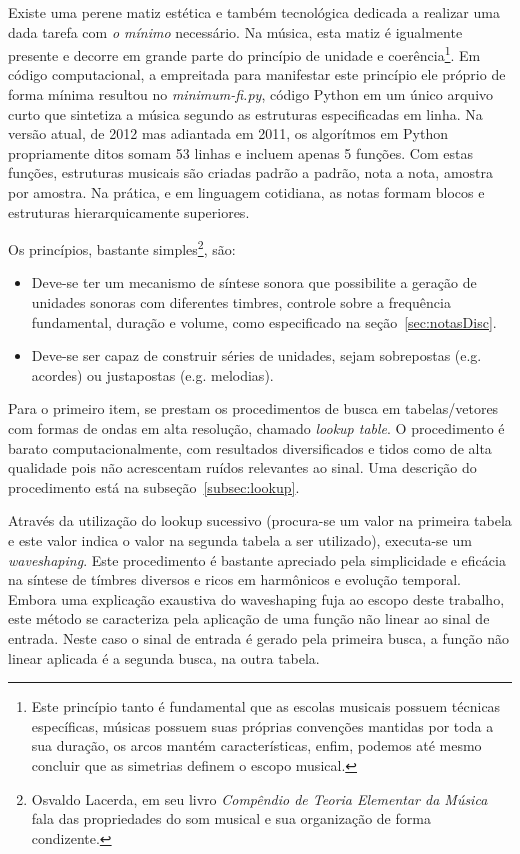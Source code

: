 Existe uma perene matiz estética e também tecnológica dedicada a realizar uma
dada tarefa com \emph{o mínimo} necessário.  Na música, esta matiz é
igualmente presente e decorre em grande parte do princípio de unidade
e coerência\footnote{Este princípio tanto é fundamental que as escolas
  musicais possuem técnicas específicas, músicas possuem suas próprias
  convenções mantidas por toda a sua duração, os arcos mantém
  características, enfim, podemos até mesmo concluir que as simetrias
  definem o escopo musical.}. 
  Em código computacional, a empreitada para
manifestar este princípio ele próprio de forma mínima resultou no
\emph{minimum-fi.py}, código Python em um único arquivo curto que
sintetiza a música segundo as estruturas especificadas em
linha. Na versão atual, de
2012 mas adiantada em 2011, os algorítmos em Python propriamente ditos
somam 53 linhas e incluem apenas 5 funções. Com estas funções,
estruturas musicais são criadas padrão a padrão, nota a nota,
amostra por amostra. Na prática, e em linguagem cotidiana,
as notas formam blocos e estruturas hierarquicamente
superiores.

Os princípios, bastante simples\footnote{Osvaldo Lacerda, em seu livro
  \emph{Compêndio de Teoria Elementar da Música} fala das propriedades
  do som musical e sua organização de forma condizente.}, são:
\begin{itemize}
  \item Deve-se ter um mecanismo de síntese sonora que possibilite a
    geração de unidades sonoras com diferentes timbres, controle sobre
    a frequência fundamental, duração e volume, como especificado na seção~\ref{sec:notasDisc}.
  \item Deve-se ser capaz de construir
    séries de unidades, sejam sobrepostas (e.g. acordes)
    ou justapostas (e.g. melodias).
\end{itemize}

Para o primeiro item, se prestam os procedimentos de busca
em tabelas/vetores com formas de ondas em alta resolução, chamado
\emph{lookup table}. O procedimento é barato computacionalmente,
com resultados diversificados e tidos como de alta qualidade
pois não acrescentam ruídos relevantes ao sinal. Uma descrição
do procedimento está na subseção~\ref{subsec:lookup}.

Através da utilização do lookup sucessivo (procura-se um valor na primeira tabela
e este valor indica o valor na segunda tabela a ser utilizado), executa-se
um \emph{waveshaping}. Este procedimento é bastante apreciado pela simplicidade e eficácia
na síntese de tímbres diversos e ricos em harmônicos e evolução temporal. Embora
uma explicação exaustiva do waveshaping fuja ao escopo deste trabalho, este
método se caracteriza pela aplicação de uma função não linear ao sinal de entrada.
Neste caso o sinal de entrada é gerado pela primeira busca, a função não linear aplicada
é a segunda busca, na outra tabela.

